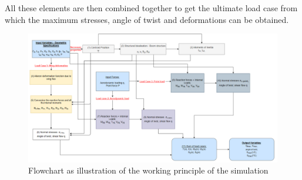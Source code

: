 All these elements are then combined together to get the ultimate load case from which the maximum stresses, angle of twist and deformations can be obtained.


\label{subsec:Flow_chart}
\begin{figure}[H]
    \centering
    \includegraphics[width=23cm, angle=90]{Images/Flowchart3.PNG}
    \caption{Flowchart as illustration of the working principle of the simulation }
    \label{flowchart}
\end{figure}



















